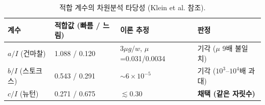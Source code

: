 \begin{table}[h]\centering
\caption{적합 계수의 차원분석 타당성 (Klein et al. 참조).}
\label{tab:validity}
\begin{tabular}{llll}
\toprule
계수 & 적합값 (빠름 / 느림) & 이론 추정 & 판정 \\
\midrule
$a/I$ (건마찰) & 1.088 / 0.120 & $3\mu g/w$, $\mu$=0.031/0.0034 & 기각 ($\mu$ 9배 불일치) \\
$b/I$ (스토크스) & 0.543 / 0.291 & $\sim 6\times10^{-5}$ & 기각 ($10^3$--$10^4$배 과대) \\
$c/I$ (뉴턴) & 0.271 / 0.675 & $\lesssim 0.30$ & \textbf{채택 (같은 자릿수)} \\
\bottomrule
\end{tabular}
\end{table}
